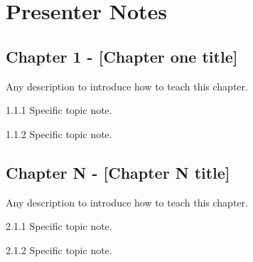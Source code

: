 \documentclass[../workbook]{subfiles}
\begin{document}

\section*{Presenter Notes}


\subsection*{Chapter 1 - [Chapter one title]}

\par{
    Any description to introduce how to teach this chapter.
}


\begin{bullets}
    \item 1.1.1 Specific topic note.
    \item 1.1.2 Specific topic note.
\end{bullets}


\subsection*{Chapter N - [Chapter N title]}

\par{
    Any description to introduce how to teach this chapter.
}


\begin{bullets}
    \item 2.1.1 Specific topic note.
    \item 2.1.2 Specific topic note.
\end{bullets}
\end{document}
